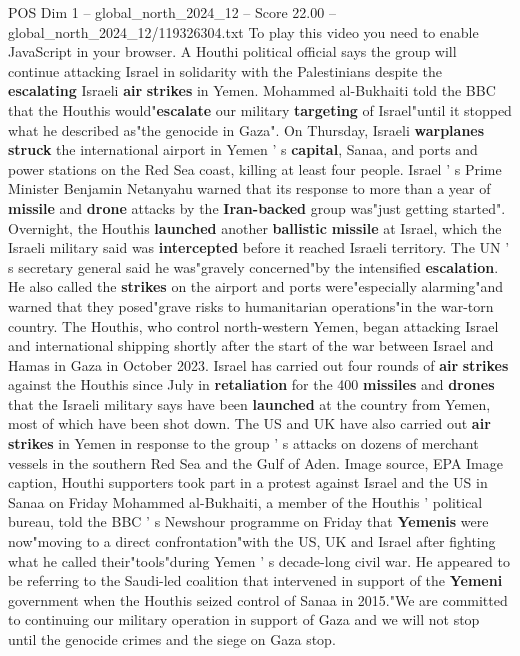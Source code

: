 \begin{textsample}{POS Dim 1 – global\_north\_2024\_12 – Score 22.00 – global\_north\_2024\_12/119326304.txt}  \label{ex:f1_pos_262}
To play this video you need to enable JavaScript in your browser.
A Houthi political official says the group will continue attacking Israel in solidarity with the Palestinians despite the \textbf{escalating} Israeli \textbf{air} \textbf{strikes} in Yemen.
Mohammed al-Bukhaiti told the BBC that the Houthis would"\textbf{escalate} our military \textbf{targeting} of Israel"until it stopped what he described as"the genocide in Gaza".
On Thursday, Israeli \textbf{warplanes} \textbf{struck} the international airport in Yemen ' s \textbf{capital}, Sanaa, and ports and power stations on the Red Sea coast, killing at least four people.
Israel ' s Prime Minister Benjamin Netanyahu warned that its response to more than a year of \textbf{missile} and \textbf{drone} attacks by the \textbf{Iran-backed} group was"just getting started".
Overnight, the Houthis \textbf{launched} another \textbf{ballistic} \textbf{missile} at Israel, which the Israeli military said was \textbf{intercepted} before it reached Israeli territory.
The UN ' s secretary general said he was"gravely concerned"by the intensified \textbf{escalation}.
He also called the \textbf{strikes} on the airport and ports were"especially alarming"and warned that they posed"grave risks to humanitarian operations"in the war-torn country.
The Houthis, who control north-western Yemen, began attacking Israel and international shipping shortly after the start of the war between Israel and Hamas in Gaza in October 2023.
Israel has carried out four rounds of \textbf{air} \textbf{strikes} against the Houthis since July in \textbf{retaliation} for the 400 \textbf{missiles} and \textbf{drones} that the Israeli military says have been \textbf{launched} at the country from Yemen, most of which have been shot down.
The US and UK have also carried out \textbf{air} \textbf{strikes} in Yemen in response to the group ' s attacks on dozens of merchant vessels in the southern Red Sea and the Gulf of Aden.
Image source, EPA Image caption, Houthi supporters took part in a protest against Israel and the US in Sanaa on Friday Mohammed al-Bukhaiti, a member of the Houthis ' political bureau, told the BBC ' s Newshour programme on Friday that \textbf{Yemenis} were now"moving to a direct confrontation"with the US, UK and Israel after fighting what he called their"tools"during Yemen ' s decade-long civil war.
He appeared to be referring to the Saudi-led coalition that intervened in support of the \textbf{Yemeni} government when the Houthis seized control of Sanaa in 2015."We are committed to continuing our military operation in support of Gaza and we will not stop until the genocide crimes and the siege on Gaza stop.

\end{textsample}
